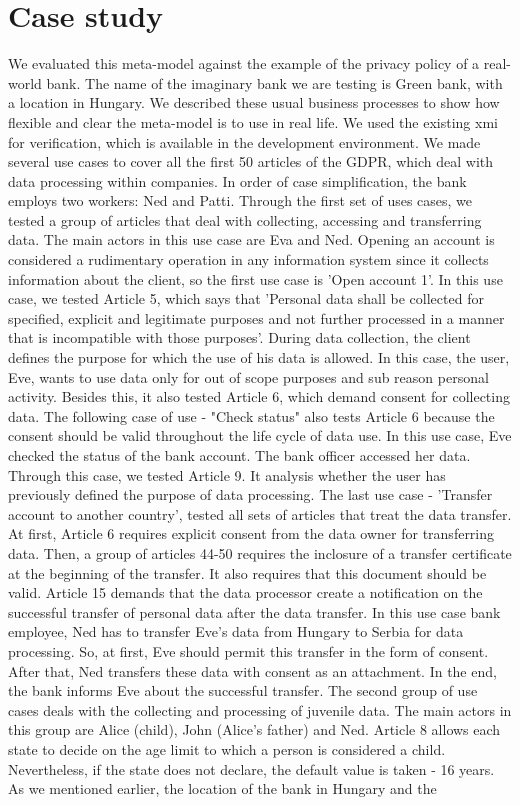 \documentclass[11pt,english]{article}
\begin{document}
\section{Case study}
We evaluated this meta-model against the example of the privacy policy of a real-world bank. The name of the imaginary bank we are testing is Green bank, with a location in Hungary. We described these usual business processes to show how flexible and clear the meta-model is to use in real life. We used the existing xmi for verification, which is available in the development environment. We made several use cases to cover all the first 50 articles of the GDPR, which deal with data processing within companies. In order of case simplification, the bank employs two workers: Ned and Patti. \newline Through the first set of uses cases, we tested a group of articles that deal with collecting, accessing and transferring data. The main actors in this use case are Eva and Ned. Opening an account is considered a rudimentary operation in any information system since it collects information about the client, so the first use case is 'Open account 1'. In this use case, we tested Article 5, which says that 'Personal data shall be collected for specified, explicit and legitimate purposes and not further processed in a manner that is incompatible with those purposes'. During data collection, the client defines the purpose for which the use of his data is allowed. In this case, the user, Eve, wants to use data only for out of scope purposes and sub reason personal activity. Besides this, it also tested Article 6, which demand consent for collecting data. The following case of use - "Check status" also tests Article 6 because the consent should be valid throughout the life cycle of data use. In this use case, Eve checked the status of the bank account. The bank officer accessed her data. Through this case, we tested Article 9. It analysis whether the user has previously defined the purpose of data processing. The last use case - 'Transfer account to another country', tested all sets of articles that treat the data transfer. At first, Article 6 requires explicit consent from the data owner for transferring data. Then, a group of articles 44-50 requires the inclosure of a transfer certificate at the beginning of the transfer. It also requires that this document should be valid. Article 15 demands that the data processor create a notification on the successful transfer of personal data after the data transfer. In this use case bank employee, Ned has to transfer Eve's data from Hungary to Serbia for data processing. So, at first, Eve should permit this transfer in the form of consent. After that, Ned transfers these data with consent as an attachment. In the end, the bank informs Eve about the successful transfer. \newline The second group of use cases deals with the collecting and processing of juvenile data. The main actors in this group are Alice (child), John (Alice's father) and Ned. Article 8 allows each state to decide on the age limit to which a person is considered a child. Nevertheless, if the state does not declare, the default value is taken - 16 years. As we mentioned earlier, the location of the bank in Hungary and the 
\end{document}
